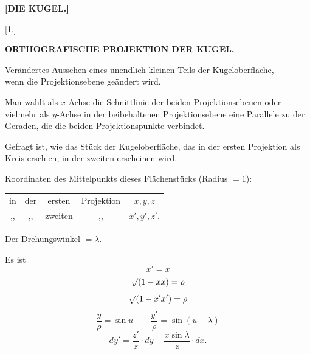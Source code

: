 \clearpage{}

\begin{center}
\large\bfseries [DIE KUGEL.]
\end{center}

\begin{center}
[1.]
\end{center}

\begin{center}
\bfseries ORTHOGRAFISCHE PROJEKTION DER KUGEL.
\end{center}

\begin{center}
Verändertes Aussehen eines unendlich kleinen Teils der Kugeloberfläche,\\
wenn die Projektionsebene geändert wird.
\end{center}

Man wählt als $x$-Achse die Schnittlinie der beiden Projektionsebenen oder vielmehr als $y$-Achse in der beibehaltenen Projektionsebene eine Parallele zu der Geraden, die die beiden Projektionspunkte verbindet.

Gefragt ist, wie das Stück der Kugeloberfläche, das in der ersten Projektion als Kreis erschien, in der zweiten erscheinen wird.

Koordinaten des Mittelpunkts dieses Flächenstücks (Radius $= 1$):

\begin{center}
\begin{tabular}{ccccc}
in & der & ersten & Projektion & $x,y,z$\\
,, & ,, & zweiten & ,, & $x',y',z'$.
\end{tabular}
\end{center}

Der Drehungswinkel $= \lambda$.

Es ist
\[
x' = x
\]
\[
\mathord{\surd}(1-xx) = \rho
\]
\[
\mathord{\surd}(1-x'x') = \rho
\]
\[
\frac{y}{\rho} = \sin u \qquad \frac{y'}{\rho} = \sin(u+\lambda)
\]
\[
dy' = \frac{z'}{z}\cdot dy - \frac{x\sin\lambda}{z}\cdot dx.
\]

